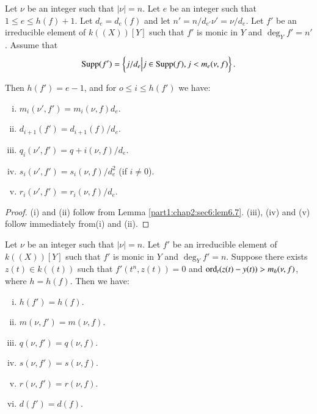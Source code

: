 \begin{prop}\label{part1:chap2:sec6:prop6.16}
  Let $\nu$ be an integer such that $|\nu|=n$. Let $e$ be an integer such that $1 \leq e \leq h(f)+1$. Let $d_e = d_e(f)$ and let $n'= n/d_{e'} \nu'= \nu/d_e$. Let $f'$ be an irreducible element of $k ((X))[Y]$ such that  $f'$ is monic in $Y$ and $\deg_Y f' = n'$. Assume that
$$
\operatorname{Supp} (f') = \left\{j/d_e \Big| j \in \operatorname{Supp} (f), j < m_e (\nu, f)\right\}.
$$ 

Then $h(f')=e-1$, and for $o \leq i \leq h(f')$ we have:
\begin{enumerate}[(i)]
\item $m_i (\nu', f') = m_i (\nu, f)d_e$.
\item $d_{i+1}(f')= d_{i+1} (f) /d_e$.
\item $q_i (\nu', f') = q+i (\nu, f)/d_e$.
\item $s_i (\nu', f')= s_i (\nu, f)/d^2_e$ (if $i \neq 0$).
\item $r_i (\nu', f') = r_i (\nu, f)/d_e$.
\end{enumerate}
\end{prop}

\begin{proof}
  (i) and (ii) follow from Lemma \ref{part1:chap2:sec6:lem6.7}. (iii), (iv) and (v) follow immediately from\pageoriginale (i) and (ii).
\end{proof}

\begin{prop}\label{part1:chap2:sec6:prop6.17}
  Let $\nu$ be an integer such that $|\nu|=n$. Let $f'$ be an irreducible element of $k((X)) [Y]$ such that $f'$ is monic in $Y$ and $\deg_Y f' =n$. Suppose there exists $z(t) \in k((t))$ such that $f' (t^n, z(t))=0$ and $\operatorname{ord}_t (z(t)- y(t))>m_h (\nu, f)$, where $h= h(f)$. Then we have:
\begin{enumerate}[(i)]
\item $h(f') = h(f)$.
\item $m(\nu, f')= m(\nu, f)$.
\item $q(\nu, f') = q (\nu, f)$.
\item $s(\nu, f')= s(\nu, f)$.
\item $r(\nu, f') = r(\nu, f)$.
\item $d(f')= d(f)$.
\end{enumerate}
\end{prop}

